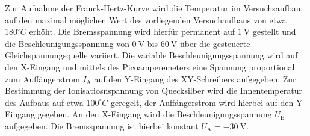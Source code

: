 Zur Aufnahme der Franck-Hertz-Kurve wird die Temperatur im Versuchsaufbau auf den maximal möglichen Wert des vorliegenden Versuchaufbaus von etwa $180^\circ C$ erhöht. Die Bremsspannung wird hierfür permanent auf $\SI{1}{\volt}$ gestellt und die Beschleunigungsspannung von $\SI{0}{\volt}$ bis $\SI{60}{\volt}$ über die gesteuerte Gleichspannungsquelle variiert.
Die variable Beschleunigungsspannung wird auf den X-Eingang und mittels des Picoamperemeters eine Spannung proportional zum Auffängerstrom $I_\mathrm{A}$ auf den Y-Eingang des XY-Schreibers aufgegeben.
Zur Bestimmung der Ionisatiosnspannung von Quecksilber wird die Innentemperatur des Aufbaus auf etwa $100^\circ C$ geregelt, der Auffängerstrom wird hierbei auf den Y-Eingang gegeben.
An den X-Eingang wird die Beschleunigungsspannung $U_\mathrm{B}$ aufgegeben. Die Bremsspannung ist hierbei konstant $U_\mathrm{A}=\SI{-30}{\volt}$.
